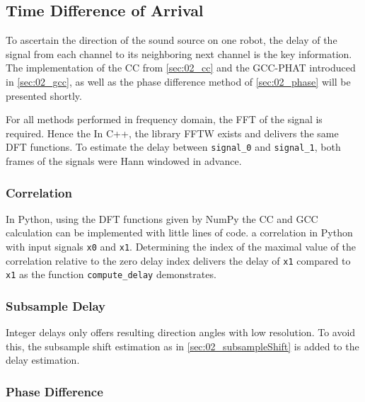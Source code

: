 \subsection{Time Difference of Arrival}
\label{subsec:03_tdoa}

To ascertain the direction of the sound source on one robot, the
delay of the signal from each channel to its neighboring
next channel is the key information.
The implementation of the \ac{CC} from \cref{sec:02_cc} and the \ac{GCC-PHAT}
introduced in \cref{sec:02_gcc}, as well as the phase difference method
of \cref{sec:02_phase} will be presented shortly.

For all methods performed in frequency domain, the \ac{FFT} of the
signal is required. Hence the 
In C++, the library \ac{FFTW} exists and delivers the same \ac{DFT} functions.
To estimate the delay between \lstinline!signal_0! and \lstinline!signal_1!,
both frames of the signals were Hann windowed in advance.
\subsubsection*{Correlation}
\label{subsubsec:03_cc}

In Python, using the \ac{DFT} functions given by NumPy the \ac{CC} and \ac{GCC} calculation
can be implemented with little lines of code.
a correlation in Python with input signals \lstinline!x0! and \lstinline!x1!.
Determining the index of the maximal value of the correlation relative to the zero delay
index delivers the delay of \lstinline!x1! compared to \lstinline!x1! as the function
\lstinline!compute_delay! demonstrates.
\subsubsection*{Subsample Delay}
\label{subsubsec:03_subsample}

Integer delays only offers resulting direction angles with low resolution.
To avoid this, the subsample shift estimation as in \cref{sec:02_subsampleShift}
is added to the delay estimation.

\subsubsection*{Phase Difference}
\label{subsubsec:03_phase}

